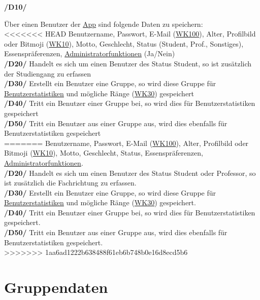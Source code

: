 \documentclass[a4paper]{scrreprt}
\begin{document}
\begin{addmargin}[25pt]{0pt}
\hypertarget{d10}{\textbf{/D10/}} Über einen Benutzer der \hyperlink{label6}{App} sind folgende Daten zu speichern:\\
<<<<<<< HEAD
Benutzername, Passwort, E-Mail (\hyperlink{wk100}{WK100}), Alter, Profilbild oder Bitmoji (\hyperlink{wk10}{WK10}), Motto, Geschlecht, Status (Student, Prof., Sonstiges), Essenspräferenzen, \hyperlink{label8}{Administratorfunktionen} (Ja/Nein)\\
\hypertarget{d20}{\textbf{/D20/}} Handelt es sich um einen Benutzer des Status Student, so ist zusätzlich der Studiengang zu erfassen\\
\hypertarget{d30}{\textbf{/D30/}} Erstellt ein Benutzer eine Gruppe, so wird diese Gruppe für \hyperlink{label9}{Benutzerstatistiken} und mögliche Ränge (\hyperlink{wk30}{WK30}) gespeichert\\
\hypertarget{d40}{\textbf{/D40/}} Tritt ein Benutzer einer Gruppe bei, so wird dies für Benutzerstatistiken gespeichert\\
\hypertarget{d50}{\textbf{/D50/}} Tritt ein Benutzer aus einer Gruppe aus, wird dies ebenfalls für Benutzerstatistiken gespeichert\\
=======
Benutzername, Passwort, E-Mail (\hyperlink{wk100}{WK100}), Alter, Profilbild oder Bitmoji (\hyperlink{wk10}{WK10}), Motto, Geschlecht, Status, Essenspräferenzen, \hyperlink{label8}{Administratorfunktionen}.\\
\hypertarget{d20}{\textbf{/D20/}} Handelt es sich um einen Benutzer des Status Student oder Professor, so ist zusätzlich die Fachrichtung zu erfassen.\\
\hypertarget{d30}{\textbf{/D30/}} Erstellt ein Benutzer eine Gruppe, so wird diese Gruppe für \hyperlink{label9}{Benutzerstatistiken} und mögliche Ränge (\hyperlink{wk30}{WK30}) gespeichert.\\
\hypertarget{d40}{\textbf{/D40/}} Tritt ein Benutzer einer Gruppe bei, so wird dies für Benutzerstatistiken gespeichert.\\
\hypertarget{d50}{\textbf{/D50/}} Tritt ein Benutzer aus einer Gruppe aus, wird dies ebenfalls für Benutzerstatistiken gespeichert.\\
>>>>>>> 1aa6ad1222b638488f61eb6b748b0e16d8ecd5b6


\end{addmargin}

\section{Gruppendaten}
\end{document}
